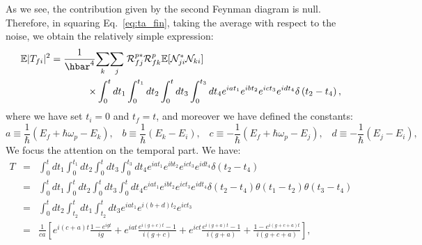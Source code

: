 \documentclass[12pt,onecolumn,amssymb,nofootinbib]{revtex4-2} %
\begin{document}
As we see, the contribution given by the second Feynman diagram is null.
Therefore, in squaring Eq.~\eqref{eq:ta_fin}, taking the average with respect
to the noise, we obtain the relatively simple expression:
\begin{eqnarray} \label{eq:dfgdff}
\lefteqn{\mathbb{E} |T_{fi}|^{2} = \frac{1}{\hbar^{4}}\underset{k}{\sum}\underset{j}{\sum}
\; {\mathcal R}_{fj}^{p*} {\mathcal R}_{fk}^{p} {\mathbb E}
[{\mathcal N}_{ji}^{*} {\mathcal N}_{ki}] }
\qquad\qquad\qquad & & \\
& & \times \int_{0}^{t}dt_{1}\int_{0}^{t_{1}}dt_{2}\int_{0}^{t}dt_{3}\int_{0}^{t_{3}}dt_{4}
e^{iat_{1}}e^{ibt_{2}}e^{ict_{3}}e^{idt_{4}}\delta\left(t_{2}-t_{4}\right),
\nonumber
\end{eqnarray}
where we have set $t_i = 0$ and $t_f = t$, and moreover we have defined the
constants:
\begin{equation} \label{eq:con1}
a\equiv\frac{1}{\hbar}\left(E_{f}+\hbar\omega_{p}-E_{k}\right),\;\;\;
b\equiv\frac{1}{\hbar}\left(E_{k}-E_{i}\right),\;\;\;
c\equiv-\frac{1}{\hbar}\left(E_{f}+\hbar\omega_{p}-E_{j}\right),\;\;\;
d\equiv-\frac{1}{\hbar}\left(E_{j}-E_{i}\right),
\end{equation}
We focus the attention on the temporal part. We have:
\begin{eqnarray}
T & = & \int_{0}^{t}dt_{1}\int_{0}^{t_{1}}dt_{2}\int_{0}^{t}dt_{3}\int_{0}^{t_{3}}dt_{4}
e^{iat_{1}}e^{ibt_{2}}e^{ict_{3}}e^{idt_{4}}\delta\left(t_{2}-t_{4}\right) \nonumber \\
& = & \int_{0}^{t}dt_{1}\int_{0}^{t}dt_{2}\int_{0}^{t}dt_{3}\int_{0}^{t}dt_{4}
e^{iat_{1}}e^{ibt_{2}}e^{ict_{3}}e^{idt_{4}}\delta\left(t_{2}-t_{4}\right)
\theta\left(t_{1}-t_{2}\right)\theta\left(t_{3}-t_{4}\right) \nonumber \\
& = & \int_{0}^{t}dt_{2}\int_{t_{2}}^{t}dt_{1}\int_{t_{2}}^{t}dt_{3}e^{iat_{1}}e^{i\left(b+d
\right)t_{2}}e^{ict_{3}} \nonumber \\
& = & \frac{1}{ca}\left[e^{i\left(c+a\right)t}\frac{1-e^{igt}}{ig}+e^{iat}
\frac{e^{i\left(g+c\right)t}-1}{i\left(g+c\right)}+e^{ict}
\frac{e^{i\left(g+a\right)t}-1}{i\left(g+a\right)}+
\frac{1-e^{i\left(g+c+a\right)t}}{i\left(g+c+a\right)}\right], \label{eq:integrale
tempi met�}
\end{eqnarray}
\end{document}
